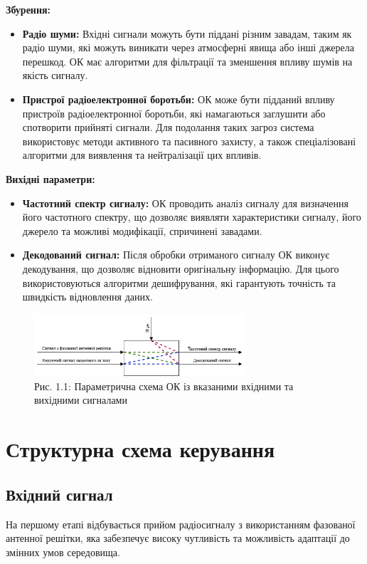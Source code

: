 \documentclass[a4paper]{article}
\begin{document}
\textbf{Збурення:}

\begin{itemize}
    \item \textbf{Радіо шуми:} Вхідні сигнали можуть бути піддані різним завадам, таким як радіо шуми, які можуть виникати через атмосферні явища або інші джерела перешкод. ОК має алгоритми для фільтрації та зменшення впливу шумів на якість сигналу.
    \item \textbf{Пристрої радіоелектронної боротьби:} ОК може бути підданий впливу пристроїв радіоелектронної боротьби, які намагаються заглушити або спотворити прийняті сигнали. Для подолання таких загроз система використовує методи активного та пасивного захисту, а також спеціалізовані алгоритми для виявлення та нейтралізації цих впливів.
\end{itemize}

\textbf{Вихідні параметри:}

\begin{itemize}
    \item \textbf{Частотний спектр сигналу:} ОК проводить аналіз сигналу для визначення його частотного спектру, що дозволяє виявляти характеристики сигналу, його джерело та можливі модифікації, спричинені завадами.
    \item \textbf{Декодований сигнал:} Після обробки отриманого сигналу ОК виконує декодування, що дозволяє відновити оригінальну інформацію. Для цього використовуються алгоритми дешифрування, які гарантують точність та швидкість відновлення даних.
\end{itemize}
\begin{figure}[h]
    \centering
    \includegraphics[width=0.7\textwidth]{imgs/PW1.1.png}
    \caption*{Рис. 1.1: Параметрична схема ОК із вказаними вхідними та вихідними сигналами}
\end{figure} 


\section*{Структурна схема керування}

\subsection*{Вхідний сигнал}  
На першому етапі відбувається прийом радіосигналу з використанням фазованої антенної решітки, яка забезпечує високу чутливість та можливість адаптації до змінних умов середовища.  
\end{document}
